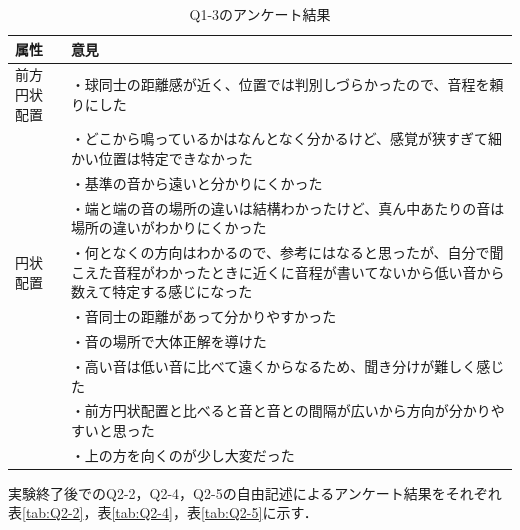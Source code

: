\begin{table}[H]\centering 
    \caption{Q1-3のアンケート結果}\label{tab:Q1-3}
    \begin{tabular}{lp{11cm}} \hline
    属性 & 意見\\ \hline
    前方円状配置 & ・球同士の距離感が近く、位置では判別しづらかったので、音程を頼りにした\\
     & ・どこから鳴っているかはなんとなく分かるけど、感覚が狭すぎて細かい位置は特定できなかった\\
     & ・基準の音から遠いと分かりにくかった\\
     & ・端と端の音の場所の違いは結構わかったけど、真ん中あたりの音は場所の違いがわかりにくかった\\ \hline
    円状配置 & ・何となくの方向はわかるので、参考にはなると思ったが、自分で聞こえた音程がわかったときに近くに音程が書いてないから低い音から数えて特定する感じになった\\
     & ・音同士の距離があって分かりやすかった\\
     & ・音の場所で大体正解を導けた\\
     & ・高い音は低い音に比べて遠くからなるため、聞き分けが難しく感じた\\
     & ・前方円状配置と比べると音と音との間隔が広いから方向が分かりやすいと思った\\ 
     & ・上の方を向くのが少し大変だった  \\ \hline
    \end{tabular}
\end{table}


実験終了後でのQ2-2，Q2-4，Q2-5の自由記述によるアンケート結果をそれぞれ表\ref{tab:Q2-2}，表\ref{tab:Q2-4}，表\ref{tab:Q2-5}に示す．



